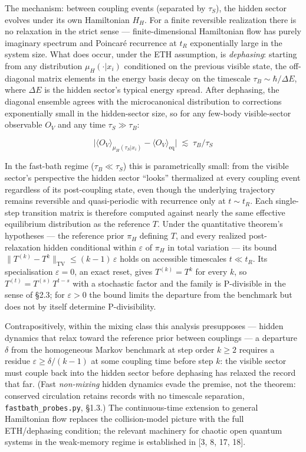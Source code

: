 \documentclass[
]{article}
\begin{document}
The mechanism: between coupling events (separated by \(\tau_S\)), the
hidden sector evolves under its own Hamiltonian \(H_H\). For a finite
reversible realization there is no relaxation in the strict sense ---
finite-dimensional Hamiltonian flow has purely imaginary spectrum and
Poincaré recurrence at \(t_R\) exponentially large in the system size.
What does occur, under the ETH assumption, is \emph{dephasing}: starting
from any distribution \(\mu_H(\cdot | x_i)\) conditioned on the previous
visible state, the off-diagonal matrix elements in the energy basis
decay on the timescale \(\tau_B \sim \hbar / \Delta E\), where
\(\Delta E\) is the hidden sector's typical energy spread. After
dephasing, the diagonal ensemble agrees with the microcanonical
distribution to corrections exponentially small in the hidden-sector
size, so for any few-body visible-sector observable \(O_V\) and any time
\(\tau_S \gg \tau_B\):

\[\big| \langle O_V \rangle_{\mu_H(\tau_S | x_i)} - \langle O_V \rangle_{\text{eq}} \big| \;\lesssim\; \tau_B / \tau_S\]

In the fast-bath regime (\(\tau_B \ll \tau_S\)) this is parametrically
small: from the visible sector's perspective the hidden sector ``looks''
thermalized at every coupling event regardless of its post-coupling
state, even though the underlying trajectory remains reversible and
quasi-periodic with recurrence only at \(t \sim t_R\). Each single-step
transition matrix is therefore computed against nearly the same
effective equilibrium distribution as the reference \(T\). Under the
quantitative theorem's hypotheses --- the reference prior \(\pi_H\)
defining \(T\), and every realized post-relaxation hidden conditional
within \(\varepsilon\) of \(\pi_H\) in total variation --- its bound
\(\|T^{(k)} - T^k\|_{\mathrm{TV}} \leq (k-1)\,\varepsilon\) holds on
accessible timescales \(t \ll t_R\). Its specialisation
\(\varepsilon = 0\), an exact reset, gives \(T^{(k)} = T^k\) for every
\(k\), so \(T^{(t)} = T^{(s)}\,T^{t-s}\) with a stochastic factor and
the family is P-divisible in the sense of §2.3; for \(\varepsilon > 0\)
the bound limits the departure from the benchmark but does not by itself
determine P-divisibility.

Contrapositively, within the mixing class this analysis presupposes ---
hidden dynamics that relax toward the reference prior between couplings
--- a departure \(\delta\) from the homogeneous Markov benchmark at step
order \(k \geq 2\) requires a residue \(\varepsilon \geq \delta/(k-1)\)
at some coupling time before step \(k\): the visible sector must couple
back into the hidden sector before dephasing has relaxed the record that
far. (Fast \emph{non-mixing} hidden dynamics evade the premise, not the
theorem: conserved circulation retains records with no timescale
separation, \texttt{fastbath\_probes.py}, §1.3.) The continuous-time
extension to general Hamiltonian flow replaces the collision-model
picture with the full ETH/dephasing condition; the relevant machinery
for chaotic open quantum systems in the weak-memory regime is
established in {[}3, 8, 17, 18{]}.
\end{document}
